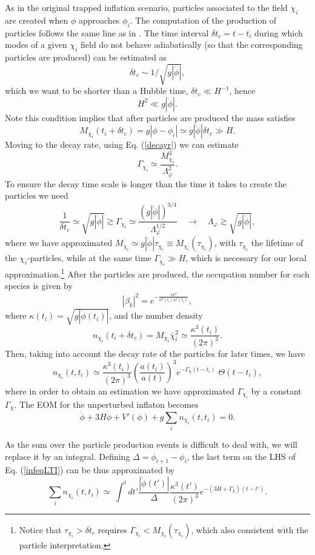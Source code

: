 \documentclass[11pt,amsmath,floats,floatfix,nofootinbib,secnumarabic, superscriptaddress, tightenlines]{revtex4}
\newcommand{\beq}{\begin{equation}}
\newcommand{\eeq}{\end{equation}}
\newcommand{\be}{\begin{equation}}
\newcommand{\ee}{\end{equation}}
\newcommand{\lp}{\left(}
\newcommand{\rp}{\right)}
\begin{document}
{As in the original trapped inflation scenario, particles associated to the field $\chi_i$ are created when $\phi$ approaches $\phi_i$.
The computation of the production of particles follows the same line as in \cite{trapped,beauty}. The time interval $\delta t_c=t-t_i$  during which modes
 of a given $\chi_i$ field do not behave adiabatically (so that the corresponding particles are produced) can be estimated as
\be \delta t_c\sim 1/\sqrt{g|\dot{\phi}|},\ee
which we want to be shorter than a Hubble time, $\delta t_c \ll H^{-1}$, hence \cite{trapped}
\be\label{c1}
H^2\ll{g|\dot{\phi}|}.
\ee
Note this condition implies that after particles are produced the mass  satisfies
\be M_{\chi_i}(t_i+\delta t_c)=g|\phi-\phi_i|\simeq g|\dot{\phi}|\delta t_c\gg H.
\ee
Moving to the decay rate, using Eq. (\ref{decayr}) we can estimate
\beq
\Gamma_{\chi_i} \simeq  \frac{M_{\chi_i}^3}{\Lambda_\varphi^2}. \label{gammab}
\eeq
To ensure the decay time scale is longer than the time it takes to create the particles  we need
\beq
\label{c2n}
 \frac{1}{\delta t_c}\simeq \sqrt{g|\dot\phi|}\gtrsim \Gamma_{\chi_i}\simeq\frac{(g|\dot{\phi}|)^{3/4}}{ \Lambda_\varphi^{1/2}} \quad\to\quad  \Lambda_\varphi \gtrsim \sqrt{g|\dot\phi|},
\eeq
where we have approximated $M_{\chi_i}\simeq g |\dot{\phi}|\tau_{\chi_i}\equiv M_{\chi_i}(\tau_{\chi_i})$, with $\tau_{\chi_i}$ the lifetime of the $\chi_i$-particles, while at the same time $\Gamma_{\chi_i} \gg H$, which is necessary for our local approximation.\footnote{Notice that $\tau_{\chi_i} > \delta t_c$ requires $\Gamma_{\chi_i} < M_{\chi_i}(\tau_{\chi_i})$, which also consistent with the particle interpretation.}  
After the particles are produced, the occupation number for each species is given by
\beq
\label{ocupnum}
|\beta_k|^2=e^{-\frac{\pi k^2}{a^2(t_i)\kappa^2(t_i)}},
\eeq where $\kappa(t_i)=\sqrt{g|\dot{\phi}(t_i)|}$, and the number density
\be\label{nchim} n_{\chi_i}(t_i+\delta t_c)=M_{\chi_i}\bar\chi^2_i\simeq \frac{\kappa^3(t_i)}{(2\pi)^3}.\ee
Then, taking into account the decay rate of the particles for later times, we have
\be n_{\chi_i}(t,t_i)\simeq \frac{\kappa^3(t_i)}{(2\pi)^3}\lp\frac{a(t_i)}{a(t)}\rp^3 e^{-\Gamma_{\chi}(t-t_i)} \; \Theta(t-t_i),\ee
where in order to obtain an estimation we have approximated $\Gamma_{\chi_i}$ by a constant $\Gamma_{\chi}$.
The EOM for the unperturbed inflaton becomes
\be\label{infeqLTI}\ddot{\phi}+3H\dot{\phi}+V'(\phi)+g\sum_in_{\chi_i}(t,t_i)=0.\ee

As the sum over the particle production events is difficult to deal with, we will replace it by an integral. Defining $\Delta=\phi_{i+1}-\phi_i$, the last term on the LHS of Eq. (\ref{infeqLTI}) can be thus approximated by
\beq
\sum_in_{\chi_i}(t,t_i)\simeq~\int^t dt'\frac{|\dot{\phi}(t')|}{\Delta}\frac{\kappa^3(t')}{(2\pi)^3}e^{-(3H+\Gamma_{\chi})(t-t')}.
\eeq

}
\end{document}

